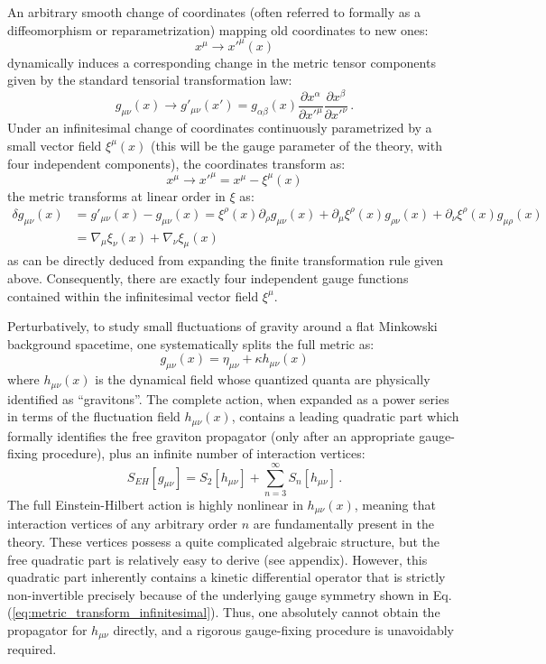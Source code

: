 An arbitrary smooth change of coordinates (often referred to formally as a diffeomorphism or reparametrization) mapping old coordinates to new ones:
\[
    x^\mu \rightarrow x'^\mu(x)
\]
dynamically induces a corresponding change in the metric tensor components given by the standard tensorial transformation law:
\begin{equation} \label{eq:metric_transform_finite}
    g_{\mu\nu}(x) \rightarrow g'_{\mu\nu}(x') = g_{\alpha\beta}(x) \frac{\partial x^\alpha}{\partial x'^\mu} \frac{\partial x^\beta}{\partial x'^\nu} \, .
\end{equation}
Under an infinitesimal change of coordinates continuously parametrized by a small vector field \(\xi^\mu(x)\) (this will be the gauge parameter of the theory, with four independent components), the coordinates transform as:
\[
    x^\mu \rightarrow x'^\mu = x^\mu - \xi^\mu(x)
\]
the metric transforms at linear order in \(\xi\) as:
\begin{equation} \label{eq:metric_transform_infinitesimal}
    \begin{aligned}
        \delta g_{\mu\nu}(x) & = g'_{\mu\nu}(x) - g_{\mu\nu}(x) = \xi^\rho(x)\partial_\rho g_{\mu\nu}(x) + \partial_\mu \xi^\rho(x) g_{\rho\nu}(x) + \partial_\nu \xi^\rho(x) g_{\mu\rho}(x) \\
                             & = \nabla_\mu \xi_\nu(x) + \nabla_\nu \xi_\mu(x)
    \end{aligned}
\end{equation}
as can be directly deduced from expanding the finite transformation rule given above. Consequently, there are exactly four independent gauge functions contained within the infinitesimal vector field \(\xi^\mu\).

Perturbatively, to study small fluctuations of gravity around a flat Minkowski background spacetime, one systematically splits the full metric as:
\begin{equation} \label{eq:metric_perturbation}
    g_{\mu\nu}(x) = \eta_{\mu\nu} + \kappa h_{\mu\nu}(x)
\end{equation}
where \(h_{\mu\nu}(x)\) is the dynamical field whose quantized quanta are physically identified as ``gravitons''. The complete action, when expanded as a power series in terms of the fluctuation field \(h_{\mu\nu}(x)\), contains a leading quadratic part which formally identifies the free graviton propagator (only after an appropriate gauge-fixing procedure), plus an infinite number of interaction vertices:
\[
    S_{EH}[g_{\mu\nu}] = S_2[h_{\mu\nu}] + \sum_{n=3}^\infty S_n[h_{\mu\nu}] \, .
\]
The full Einstein-Hilbert action is highly nonlinear in \(h_{\mu\nu}(x)\), meaning that interaction vertices of any arbitrary order \(n\) are fundamentally present in the theory. These vertices possess a quite complicated algebraic structure, but the free quadratic part is relatively easy to derive (see appendix). However, this quadratic part inherently contains a kinetic differential operator that is strictly non-invertible precisely because of the underlying gauge symmetry shown in Eq. (\ref{eq:metric_transform_infinitesimal}). Thus, one absolutely cannot obtain the propagator for \(h_{\mu\nu}\) directly, and a rigorous gauge-fixing procedure is unavoidably required.

